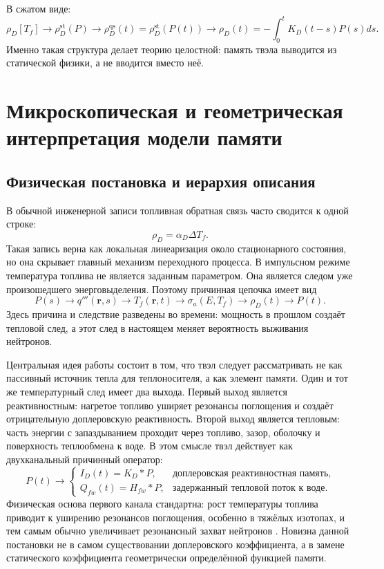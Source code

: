 \documentclass[12pt]{article}
\begin{document}
В сжатом виде:
\[
\boxed{
\rho_D[T_f]
\rightarrow
\rho_D^{\mathrm{st}}(P)
\rightarrow
\rho_D^{\mathrm{qs}}(t)=\rho_D^{\mathrm{st}}(P(t))
\rightarrow
\rho_D(t)=-\int_0^tK_D(t-s)P(s)ds.
}
\]
Именно такая структура делает теорию целостной: память твэла выводится из статической физики, а не вводится вместо неё.

\section{Микроскопическая и геометрическая интерпретация модели памяти}

\subsection{Физическая постановка и иерархия описания}

В обычной инженерной записи топливная обратная связь часто сводится к одной строке:
\[
\rho_D=\alpha_D\Delta T_f.
\]
Такая запись верна как локальная линеаризация около стационарного состояния, но она скрывает главный механизм переходного процесса. В импульсном режиме температура топлива не является заданным параметром. Она является следом уже произошедшего энерговыделения. Поэтому причинная цепочка имеет вид
\[
\boxed{
P(s)
\rightarrow
q'''(\mathbf r,s)
\rightarrow
T_f(\mathbf r,t)
\rightarrow
\sigma_a(E,T_f)
\rightarrow
\rho_D(t)
\rightarrow
P(t).
}
\]
Здесь причина и следствие разведены во времени: мощность в прошлом создаёт тепловой след, а этот след в настоящем меняет вероятность выживания нейтронов.

Центральная идея работы состоит в том, что твэл следует рассматривать не как пассивный источник тепла для теплоносителя, а как элемент памяти. Один и тот же температурный след имеет два выхода. Первый выход является реактивностным: нагретое топливо уширяет резонансы поглощения и создаёт отрицательную доплеровскую реактивность. Второй выход является тепловым: часть энергии с запаздыванием проходит через топливо, зазор, оболочку и поверхность теплообмена к воде. В этом смысле твэл действует как двухканальный причинный оператор:
\[
P(t)
\longrightarrow
\begin{cases}
I_D(t)=K_D*P, & \text{доплеровская реактивностная память},\\[3pt]
Q_{fw}(t)=H_{fw}*P, & \text{задержанный тепловой поток к воде}.
\end{cases}
\]
Физическая основа первого канала стандартна: рост температуры топлива приводит к уширению резонансов поглощения, особенно в тяжёлых изотопах, и тем самым обычно увеличивает резонансный захват нейтронов \cite{NRCFeedback2012,DOEGeneralTechnicalBase2013}. Новизна данной постановки не в самом существовании доплеровского коэффициента, а в замене статического коэффициента геометрически определённой функцией памяти.
\end{document}
